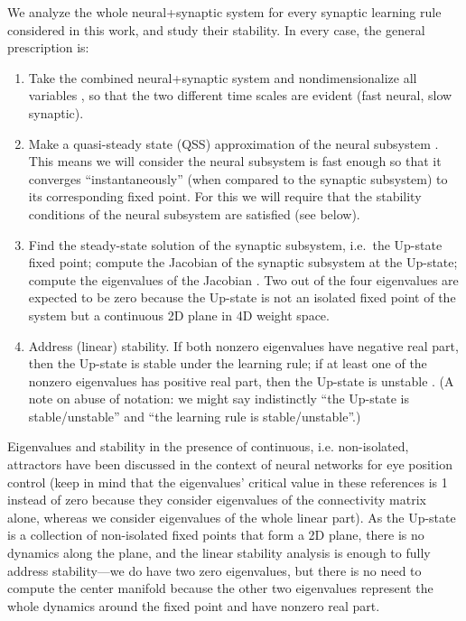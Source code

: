 \documentclass[twocolumn]{article}
\begin{document}
We analyze the whole neural+synaptic system for every synaptic learning rule considered in this work, and study their stability. In every case, the general prescription is:
\begin{enumerate}
\item Take the combined neural+synaptic system and nondimensionalize all variables \cite[see Sections 1.2 and 1.4 of Ref.\ ][]{Keener1998}\cite[see Section 3.5 of Ref.\ ][]{Strogatz2018}, so that the two different time scales are evident (fast neural, slow synaptic).
\item Make a quasi-steady state (QSS) approximation of the neural subsystem \cite{Keener1998,Strogatz2018}. This means we will consider the neural subsystem is fast enough so that it converges ``instantaneously'' (when compared to the synaptic subsystem) to its corresponding fixed point. 
For this we will require that the stability conditions of the neural subsystem are satisfied (see below).
\item Find the steady-state solution of the synaptic subsystem, i.e.\ the Up-state fixed point; compute the Jacobian of the synaptic subsystem at the Up-state; compute the eigenvalues of the Jacobian \cite{Strogatz2018,Wiggins1996}. Two out of the four eigenvalues are expected to be zero because the Up-state is not an isolated fixed point of the system but a continuous 2D plane in 4D weight space.
\item Address (linear) stability. If both nonzero eigenvalues have negative real part, then the Up-state is stable under the learning rule; if at least one of the nonzero eigenvalues has positive real part, then the Up-state is unstable \cite{Strogatz2018,Wiggins1996}. (A note on abuse of notation: we might say indistinctly ``the Up-state is stable/unstable'' and ``the learning rule is stable/unstable''.)
\end{enumerate}

Eigenvalues and stability in the presence of continuous, i.e. non-isolated, attractors have been discussed in the context of neural networks for eye position control \cite{Seung1996,Seung1998} (keep in mind that the eigenvalues' critical value in these references is 1 instead of zero because they consider eigenvalues of the connectivity matrix alone, whereas we consider eigenvalues of the whole linear part). As the Up-state is a collection of non-isolated fixed points that form a 2D plane, there is no dynamics along the plane, and the linear stability analysis is enough to fully address stability---we do have two zero eigenvalues, but there is no need to compute the center manifold \cite{Wiggins1996} because the other two eigenvalues represent the whole dynamics around the fixed point and have nonzero real part.
\end{document}
